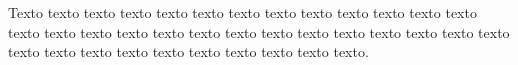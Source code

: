 \label{an:exemplo-de-anexo}

Texto texto texto texto texto texto texto  texto texto texto  texto texto texto  texto texto texto  texto texto texto  texto texto texto  texto texto texto  texto texto texto  texto texto texto  texto texto texto  texto texto texto. 